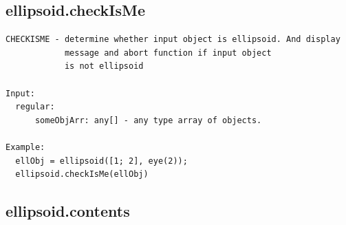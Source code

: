 \documentclass[letterpaper,10pt,english]{sphinxmanual}
\begin{document}
\subsection{ellipsoid.checkIsMe}
\label{chap_functions:ellipsoid-checkisme}
\begin{Verbatim}[commandchars=\\\{\}]
CHECKISME - determine whether input object is ellipsoid. And display
            message and abort function if input object
            is not ellipsoid

Input:
  regular:
      someObjArr: any[] - any type array of objects.

Example:
  ellObj = ellipsoid([1; 2], eye(2));
  ellipsoid.checkIsMe(ellObj)
\end{Verbatim}


\subsection{ellipsoid.contents}
\label{chap_functions:ellipsoid-contents}
\end{document}
